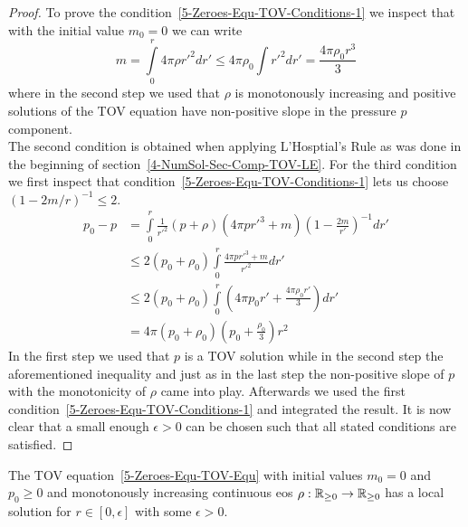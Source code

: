 \begin{proof}
	To prove the condition~\eqref{5-Zeroes-Equ-TOV-Conditions-1} we inspect that with the initial value $m_0=0$ we can write
	\[
		m = \int\limits_0^r 4\pi\rho r'^2 dr'\leq4\pi\rho_0\int\limits r'^2 dr'=\frac{4\pi\rho_0 r^3}{3}
	\]
	where in the second step we used that $\rho$ is monotonously increasing and positive solutions of the \ac{TOV} equation have non-positive slope in the pressure $p$ component.\\
	The second condition is obtained when applying L'Hosptial's Rule as was done in the beginning of section~\ref{4-NumSol-Sec-Comp-TOV-LE}.
	For the third condition we first inspect that condition~\ref{5-Zeroes-Equ-TOV-Conditions-1} lets us choose $(1-2m/r)^{-1}\leq 2$.
	\begin{align}
		p_0 - p &=\int\limits_0^r\frac{1}{r'^2}\left(p+\rho\right)\left(4\pi pr'^3+m\right)\left(1-\frac{2m}{r'}\right)^{-1}dr'\\
				&\leq2\left(p_0+\rho_0\right)\int\limits_0^r\frac{4\pi pr'^3+m}{r'^2}dr'\\
				&\leq2(p_0+\rho_0)\int\limits_0^r\left(4\pi p_0 r' + \frac{4\pi\rho_0 r'}{3}\right)dr'\\
				&=4\pi(p_0+\rho_0)\left(p_0+\frac{\rho_0}{3}\right)r^2
	\end{align}
	In the first step we used that $p$ is a \ac{TOV} solution while in the second step the aforementioned inequality and just as in the last step the non-positive slope of $p$ with the monotonicity of $\rho$ came into play.
	Afterwards we used the first condition~\ref{5-Zeroes-Equ-TOV-Conditions-1} and integrated the result.
	It is now clear that a small enough $\epsilon>0$ can be chosen such that all stated conditions are satisfied.
\end{proof}
\begin{lemma}
	The \ac{TOV} equation~\ref{5-Zeroes-Equ-TOV-Equ} with initial values $m_0=0$ and $p_0\geq0$ and monotonously increasing continuous \ac{eos} $\rho:\mathbb{R}_{\geq0}\rightarrow\mathbb{R}_{\geq0}$ has a local solution for $r\in[0,\epsilon]$ with some $\epsilon>0$.
\end{lemma}
